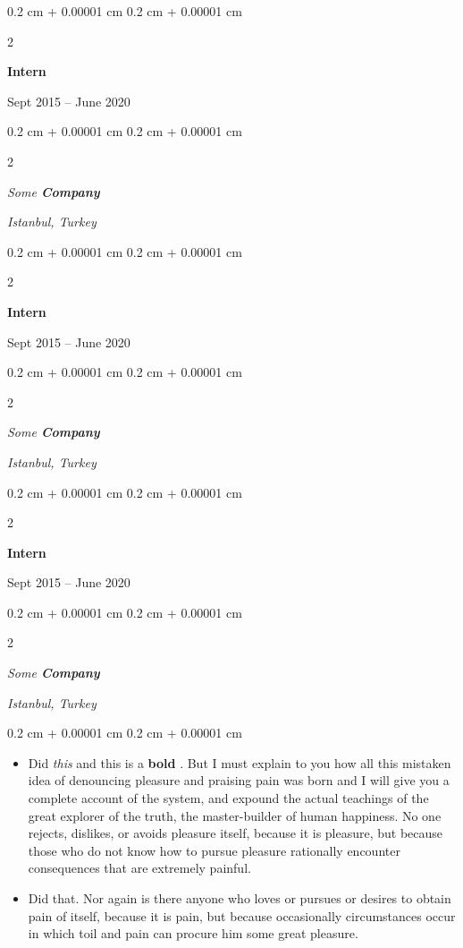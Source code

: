 \documentclass[10pt, letterpaper]{article}
\newenvironment{highlights}{
    \begin{itemize}[
        topsep=0.10 cm,
        parsep=0.10 cm,
        partopsep=0pt,
        itemsep=0pt,
        leftmargin=0.4 cm + 10pt
    ]
}{
    \end{itemize}
} %
\newenvironment{onecolentry}{
    \begin{adjustwidth}{
        0.2 cm + 0.00001 cm
    }{
        0.2 cm + 0.00001 cm
    }
}{
    \end{adjustwidth}
} %
\newenvironment{twocolentry}[2][]{
    \onecolentry
    \def\secondColumn{#2}
    \setcolumnwidth{\fill, 4.5 cm}
    \begin{paracol}{2}
}{
    \switchcolumn \raggedleft \secondColumn
    \end{paracol}
    \endonecolentry
} %
\let\hrefWithoutArrow\href
\renewcommand{\href}[2]{\hrefWithoutArrow{#1}{\ifthenelse{\equal{#2}{}}{ }{#2 }\raisebox{.15ex}{\footnotesize \faExternalLink*}}}
\begin{document}
        \vspace{0.2 cm}

                \begin{twocolentry}{
                    Sept 2015 – June 2020
                }
                \textbf{Intern}
                \end{twocolentry}
            \begin{twocolentry}{
        \textit{Istanbul, Turkey}    }
            \textit{Some \textbf{Company}}
            \end{twocolentry}



        \vspace{0.2 cm}

                \begin{twocolentry}{
                    Sept 2015 – June 2020
                }
                \textbf{Intern}
                \end{twocolentry}
            \begin{twocolentry}{
        \textit{Istanbul, Turkey}    }
            \textit{Some \textbf{Company}}
            \end{twocolentry}



        \vspace{0.2 cm}

                \begin{twocolentry}{
                    Sept 2015 – June 2020
                }
                \textbf{Intern}
                \end{twocolentry}
            \begin{twocolentry}{
        \textit{Istanbul, Turkey}    }
            \textit{Some \textbf{Company}}
            \end{twocolentry}

        \vspace{0.10 cm}
        \begin{onecolentry}
            \begin{highlights}
                \item Did \textit{this} and this is a \textbf{bold} \href{https://example.com}{link}. But I must explain to you how all this mistaken idea of denouncing pleasure and praising pain was born and I will give you a complete account of the system, and expound the actual teachings of the great explorer of the truth, the master-builder of human happiness. No one rejects, dislikes, or avoids pleasure itself, because it is pleasure, but because those who do not know how to pursue pleasure rationally encounter consequences that are extremely painful.
                \item Did that. Nor again is there anyone who loves or pursues or desires to obtain pain of itself, because it is pain, but because occasionally circumstances occur in which toil and pain can procure him some great pleasure.
            \end{highlights}
        \end{onecolentry}
\end{document}
